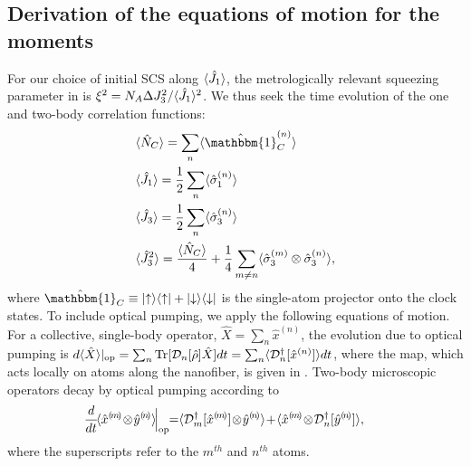 \documentclass[aps,pra,twocolumn]{revtex4-1} %
\newcommand{\jx}{\hat{J}_1}
\begin{document}
\begin{appendix}
\section{Derivation of the equations of motion for the moments} \label{Appendix::OpticalPumping}	

For our choice of initial SCS along $\expt{\jx}$, the metrologically relevant squeezing parameter in  is $\xi^2 = N_A \Delta J_3^2/\langle{\hat{J}_1}\rangle^2$.  
We thus seek the time evolution of the one and two-body correlation functions:
\begin{align}
&\expt{\hat{N}_C} = \sum_n \expt{\hat{\mathbbm{1}}^{(n)}_C} \\
&\expt{\hat{J}_1} = \frac{1}{2} \sum_n \expt{\hat{\sigma}_1^{(n)}} \\
&\expt{\hat{J}_3} = \frac{1}{2} \sum_n \expt{\hat{\sigma}_3^{(n)}} \\
&\expt{\hat{J}_3^2} = \frac{\expt{\hat{N}_C}}{4} +\frac{1}{4} \sum_{m \neq n} \expt{\hat{\sigma}_3^{(m)}\otimes \hat{\sigma}_3^{(n)}}, 
\end{align}
where $\hat{\mathbbm{1}}_C \equiv \op{\uparrow}{\uparrow} + \op{\downarrow}{\downarrow}$ is the single-atom projector onto the clock states. 
To include optical pumping, we apply the following equations of motion. For a collective, single-body operator, $\hat{X} = \sum_n \hat{x}^{(n)}$, the evolution due to optical pumping is $d\langle{ \hat{X}}\rangle|_{\rm op} = \sum_n \mbox{Tr} [\mathcal{D}_n[\hat{\rho}]\hat{X} ]dt = \sum_n \langle{\mathcal{D}_n^\dagger[\hat{x}^{(n)}]}\rangle dt$, where the map, which acts locally on atoms along the nanofiber, is given in .  
Two-body microscopic operators decay by optical pumping according to \cite{baragiola_three-dimensional_2014}
	\begin{align} \label{Eq::TwoBodyDecay}
		\!\!\!\!\!\frac{d}{dt}\! \expt{ \hat{x}^{(\!m\!)} \!\otimes\! \hat{y}^{(\!n\!)} } \!\Big|_{\rm op} \!\!= &\expt{ \mathcal{D}_m\dg[ \hat{x}^{(\!m\!)}] \!\otimes\! \hat{y}^{(\!n\!)} } \!+\! \expt{ \hat{x}^{(\!m\!)}\!\otimes\! \mathcal{D}_n\dg[ \hat{y}^{(\!n\!)}] },
	\end{align}
where the superscripts refer to the $m^{th}$ and $n^{th}$ atoms. 


\end{appendix}
\end{document}
